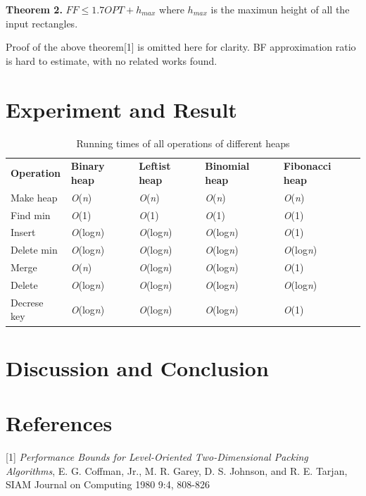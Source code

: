 \documentclass[12pt]{article}
\begin{document}
    \textbf{Theorem 2.} $FF \le 1.7OPT + h_{max}$ where $h_{max}$ is the maximun height of 
    all the input rectangles.

    Proof of the above theorem[1] is omitted here for clarity. BF approximation ratio
    is hard to estimate, with no related works found.
    \section{Experiment and Result}
    \begin{table}[h]
        \centering
		\begin{tabular}{l l l l l}
			
			\textbf{Operation} & \textbf{Binary heap} & \textbf{Leftist heap} & \textbf{Binomial heap} & \textbf{Fibonacci heap}\\
			
			Make heap    & \emph{O}(\emph{n}) & \emph{O}(\emph{n}) & \emph{O}(\emph{n}) & \emph{O}(\emph{n})\\
			Find min     & \emph{O}(1)        & \emph{O}(1)        & \emph{O}(1)        & \emph{O}(1)\\
			Insert       & \emph{O}(log\emph{n}) & \emph{O}(log\emph{n}) & \emph{O}(log\emph{n}) & \emph{O}(1)\\
            Delete min   & \emph{O}(log\emph{n}) & \emph{O}(log\emph{n}) & \emph{O}(log\emph{n}) & \emph{O}(log\emph{n})\\
            Merge        & \emph{O}(\emph{n}) & \emph{O}(log\emph{n}) & \emph{O}(log\emph{n}) & \emph{O}(1)\\
            Delete       & \emph{O}(log\emph{n}) & \emph{O}(log\emph{n}) & \emph{O}(log\emph{n}) & \emph{O}(log\emph{n})\\
            Decrese key  & \emph{O}(log\emph{n}) & \emph{O}(log\emph{n}) & \emph{O}(log\emph{n}) & \emph{O}(1)
		\end{tabular}
		\caption{Running times of all operations of different heaps}
	\end{table}
    \section{Discussion and Conclusion}
    
    \section{References}
    [1] \emph{Performance Bounds for Level-Oriented Two-Dimensional Packing Algorithms}, 
    E. G. Coffman, Jr., M. R. Garey, D. S. Johnson, and R. E. Tarjan, SIAM Journal on Computing 1980 9:4, 808-826
\end{document}
